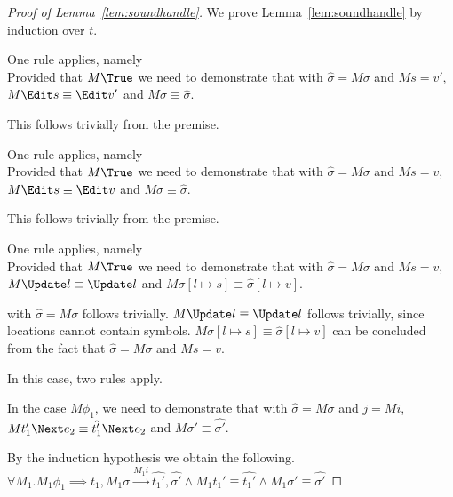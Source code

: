 \begin{proof}[Proof of Lemma~\ref{lem:soundhandle}]
  We prove Lemma~\ref{lem:soundhandle} by induction over $t$.\\

    {One rule applies, namely \\
    Provided that $M\True$ we need to demonstrate that  with $\hat{\sigma}=M\sigma$ and $M s = v'$,
    $M \Edit s\equiv \Edit v'$ and $ M\sigma\equiv \hat{\sigma}$.

    This follows trivially from the premise.

    }

  {One rule applies, namely \\
  Provided that $M\True$ we need to demonstrate that  with $\hat{\sigma}=M\sigma$ and $M s = v$,
  $M \Edit s \equiv \Edit v$ and $ M\sigma\equiv \hat{\sigma}$.

  This follows trivially from the premise.

  }

  {One rule applies, namely \\
  Provided that $M\True$
  we need to demonstrate that   with $\hat{\sigma}=M\sigma$ and $M s = v$,
  $M \Update l \equiv \Update l$ and $ M\sigma[l\mapsto s]\equiv \hat{\sigma}[l\mapsto v]$.

   with $\hat{\sigma}=M\sigma$ follows trivially.
  $M \Update l \equiv \Update l$ follows trivially, since locations cannot contain symbols. $ M\sigma[l\mapsto s]\equiv \hat{\sigma}[l\mapsto v]$ can be concluded from the fact that $\hat{\sigma}=M\sigma$ and $M s = v$.

  }

  {In this case, two rules apply.\\



  {In the case $M\phi_1$, we need to demonstrate that  with $\hat{\sigma}=M\sigma$ and $j= M i$,
  $M t_1' \Next e_2 \equiv \hat{t_1'}\Next e_2$ and $M\sigma'\equiv\hat{\sigma'}$.

  By the induction hypothesis we obtain the following.\\
  $\forall M_1 . M_1 \phi_1 \implies t_1,M_1\sigma \xrightarrow[]{M_1 i} \hat{t_1'},\hat{\sigma'}\land M_1 t_1'\equiv\hat{t_1'}\land M_1\sigma' \equiv \hat{\sigma'}$

}}
\end{proof}

